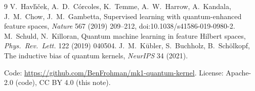 \documentclass[11pt]{article}
\begin{document}
\begin{thebibliography}{9}
 V.~Havl\'{\i}\v{c}ek, A.~D.~C\'orcoles, K.~Temme, A.~W.~Harrow, A.~Kandala, J.~M.~Chow, J.~M.~Gambetta,
Supervised learning with quantum-enhanced feature spaces, \emph{Nature} 567 (2019) 209--212, doi:10.1038/s41586-019-0980-2.
 M.~Schuld, N.~Killoran, Quantum machine learning in feature Hilbert spaces, \emph{Phys.\ Rev.\ Lett.} 122 (2019) 040504.
 J.~M.~K\"ubler, S.~Buchholz, B.~Sch\"olkopf, The inductive bias of quantum kernels, \emph{NeurIPS} 34 (2021).
\end{thebibliography}
Code: \url{https://github.com/BenFrohman/mk1-quantum-kernel}. License: Apache-2.0 (code), CC BY 4.0 (this note).
\end{document}
